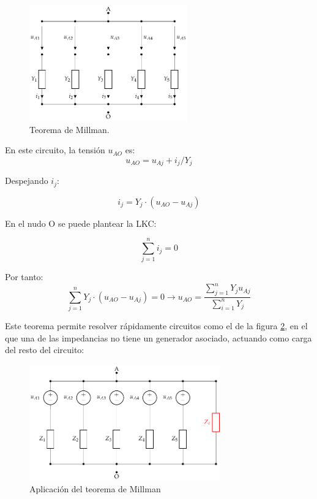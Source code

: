 \begin{figure}[H]
  \centering
  \includegraphics[height=5cm]{../figs/Millman.pdf}
  \caption{Teorema de Millman.}
  \label{fig:teorema-millman}
\end{figure}

En este circuito, la tensión $u_{AO}$ es:
\begin{equation}
  u_{AO} = u_{Aj} + i_j/Y_j
\end{equation}

Despejando $i_j$:

\begin{equation}
  i_j = Y_j \cdot (u_{AO} - u_{Aj})
\end{equation}

En el nudo O se puede plantear la LKC:

\begin{equation}
  \sum_{j = 1}^n i_j = 0
\end{equation}

Por tanto:
\begin{equation}
  \sum_{j = 1}^n Y_j \cdot (u_{AO} - u_{Aj}) = 0 \rightarrow \boxed{u_{AO} = \frac{\sum_{j = 1}^n Y_j u_{Aj}}{\sum_{i = 1}^n Y_j}}
\end{equation}

Este teorema permite resolver rápidamente circuitos como el de la figura \ref{fig:teorema-millman-aplicacion}, en el que una de las impedancias no tiene un generador asociado, actuando como carga del resto del circuito:

\begin{figure}[H]
  \centering
  \includegraphics[height=5cm]{../figs/Millman_aplicacion.pdf}
  \caption{Aplicación del teorema de Millman}
  \label{fig:teorema-millman-aplicacion}
\end{figure}


